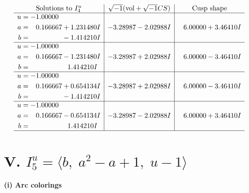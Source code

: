 \documentclass[1p]{elsarticle_modified}
\theoremstyle{definition}
\newcommand{\I}{\sqrt{-1}}
\begin{document}
$$\begin{array}{c|c|c}  
\text{Solutions to }I^u_{4}& \I (\text{vol} + \sqrt{-1}CS) & \text{Cusp shape}\\
 \hline 
\begin{aligned}
u &= -1.00000\phantom{ +0.000000I} \\
a &= \phantom{-}0.166667 + 1.231480 I \\
b &= \phantom{-0.000000 } -1.414210 I\end{aligned}
 & -3.28987 - 2.02988 I & \phantom{-}6.00000 + 3.46410 I \\ \hline\begin{aligned}
u &= -1.00000\phantom{ +0.000000I} \\
a &= \phantom{-}0.166667 - 1.231480 I \\
b &= \phantom{-0.000000 -}1.414210 I\end{aligned}
 & -3.28987 + 2.02988 I & \phantom{-}6.00000 - 3.46410 I \\ \hline\begin{aligned}
u &= -1.00000\phantom{ +0.000000I} \\
a &= \phantom{-}0.166667 + 0.654134 I \\
b &= \phantom{-0.000000 } -1.414210 I\end{aligned}
 & -3.28987 + 2.02988 I & \phantom{-}6.00000 - 3.46410 I \\ \hline\begin{aligned}
u &= -1.00000\phantom{ +0.000000I} \\
a &= \phantom{-}0.166667 - 0.654134 I \\
b &= \phantom{-0.000000 -}1.414210 I\end{aligned}
 & -3.28987 - 2.02988 I & \phantom{-}6.00000 + 3.46410 I\\
 \hline 
 \end{array}$$\newpage\newpage\renewcommand{\arraystretch}{1}
\centering \section*{V. $I^u_{5}= \langle b,\;a^2- a+1,\;u-1 \rangle$}
\flushleft \textbf{(i) Arc colorings}\\
\end{document}
